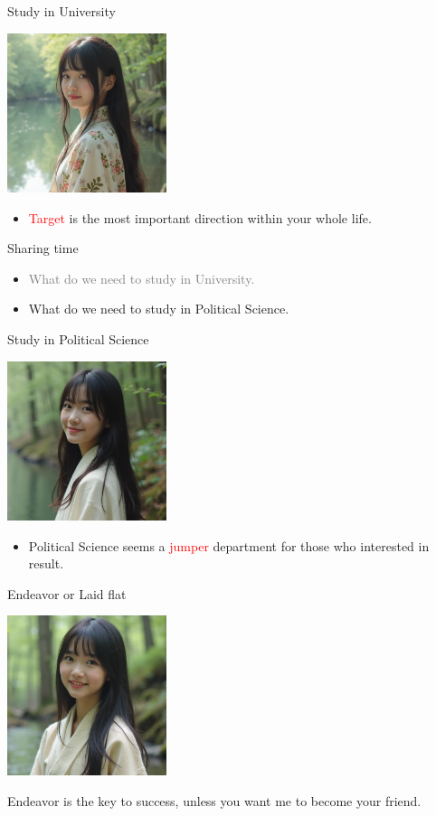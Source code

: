 \documentclass{beamer}
\begin{document}
\begin{frame}{Study in University}
\begin{center}
\includegraphics[width=0.35\textwidth]{target.png}
\end{center}
\begin{itemize}
\item \textcolor{red}{Target} is the most important direction within your whole life.
\end{itemize}
\end{frame}
\begin{frame}{Sharing time}
\begin{itemize}
\item \textcolor{gray}{What do we need to study in University.}
\item What do we need to study in Political Science.
\end{itemize}
\end{frame}
\begin{frame}{Study in Political Science}
\begin{center}
\includegraphics[width=0.35\textwidth]{motivate.png}
\end{center}
\begin{itemize}
\item Political Science seems a \textcolor{red}{jumper} department for those who interested in result.
\end{itemize}
\end{frame}
\begin{frame}{Endeavor or Laid flat}
\begin{center}
\includegraphics[width=0.35\textwidth]{fail.png}
\end{center}
\begin{center}
Endeavor is the key to success, unless you want me to become your friend.
\end{center}
\end{frame}
\end{document}
